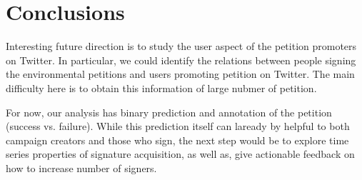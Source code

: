 \section{Conclusions}
\jp{\lipsum[2]}

Interesting future direction is to study the user aspect of the petition promoters on Twitter. In particular, we could identify 
the relations between people signing the environmental petitions and users promoting petition on Twitter. The main difficulty here is to obtain this information of large nubmer of petition.

For now, our analysis has binary prediction and annotation of the petition (success vs. failure). While this prediction itself can laready by helpful to both campaign creators and those who sign, the next step would be to explore time series properties of signature acquisition, as well as, give actionable feedback on how to increase number of signers.